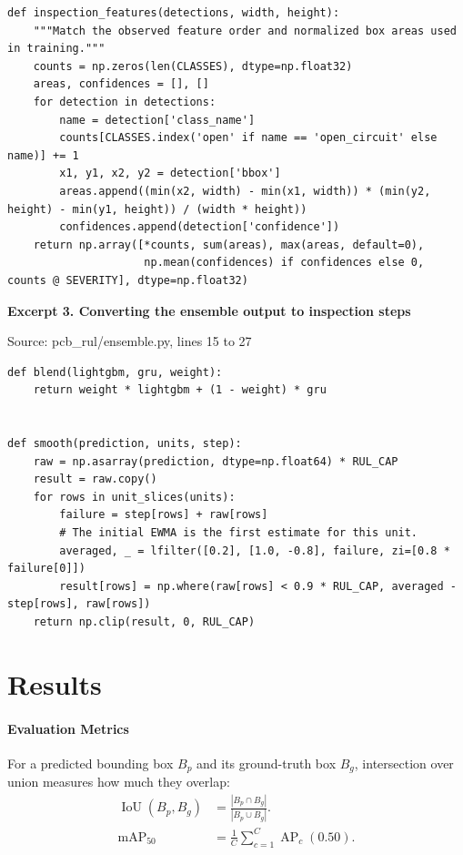 \documentclass[conference]{IEEEtran}
\begin{document}
\begin{Verbatim}[fontsize=\scriptsize,breaklines=true,breakanywhere=true]
def inspection_features(detections, width, height):
    """Match the observed feature order and normalized box areas used in training."""
    counts = np.zeros(len(CLASSES), dtype=np.float32)
    areas, confidences = [], []
    for detection in detections:
        name = detection['class_name']
        counts[CLASSES.index('open' if name == 'open_circuit' else name)] += 1
        x1, y1, x2, y2 = detection['bbox']
        areas.append((min(x2, width) - min(x1, width)) * (min(y2, height) - min(y1, height)) / (width * height))
        confidences.append(detection['confidence'])
    return np.array([*counts, sum(areas), max(areas, default=0),
                     np.mean(confidences) if confidences else 0, counts @ SEVERITY], dtype=np.float32)
\end{Verbatim}

\textbf{Excerpt 3. Converting the ensemble output to inspection steps}

Source: pcb\_rul/ensemble.py, lines 15 to 27

\begin{Verbatim}[fontsize=\scriptsize,breaklines=true,breakanywhere=true]
def blend(lightgbm, gru, weight):
    return weight * lightgbm + (1 - weight) * gru


def smooth(prediction, units, step):
    raw = np.asarray(prediction, dtype=np.float64) * RUL_CAP
    result = raw.copy()
    for rows in unit_slices(units):
        failure = step[rows] + raw[rows]
        # The initial EWMA is the first estimate for this unit.
        averaged, _ = lfilter([0.2], [1.0, -0.8], failure, zi=[0.8 * failure[0]])
        result[rows] = np.where(raw[rows] < 0.9 * RUL_CAP, averaged - step[rows], raw[rows])
    return np.clip(result, 0, RUL_CAP)
\end{Verbatim}

\section{Results}

\paragraph{Evaluation Metrics}
For a predicted bounding box \(B_p\) and its ground-truth box \(B_g\), intersection over union measures how much they overlap:
\begin{equation}
\begin{aligned}
\operatorname{IoU}(B_p,B_g)&=\frac{|B_p\cap B_g|}{|B_p\cup B_g|}.\\
\operatorname{mAP}_{50}&=\frac{1}{C}\sum_{c=1}^{C}\operatorname{AP}_{c}(0.50).
\end{aligned}
\end{equation}
\end{document}
